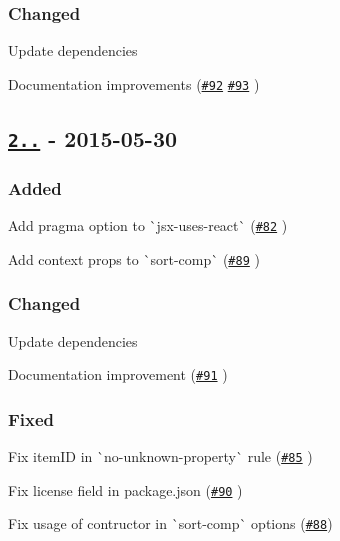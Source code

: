 \subsubsection*{Changed}


\begin{DoxyItemize}
\item Update dependencies
\item Documentation improvements (\href{https://github.com/yannickcr/eslint-plugin-react/pull/92}{\tt \#92} \href{https://github.com/yannickcr/eslint-plugin-react/pull/93}{\tt \#93} )
\end{DoxyItemize}

\subsection*{\href{https://github.com/yannickcr/eslint-plugin-react/compare/v2.3.0...v2.4.0}{\tt 2..} -\/ 2015-\/05-\/30}

\subsubsection*{Added}


\begin{DoxyItemize}
\item Add pragma option to \`{}jsx-\/uses-\/react\`{} (\href{https://github.com/yannickcr/eslint-plugin-react/pull/82}{\tt \#82} )
\item Add context props to \`{}sort-\/comp\`{} (\href{https://github.com/yannickcr/eslint-plugin-react/pull/89}{\tt \#89} )
\end{DoxyItemize}

\subsubsection*{Changed}


\begin{DoxyItemize}
\item Update dependencies
\item Documentation improvement (\href{https://github.com/yannickcr/eslint-plugin-react/pull/91}{\tt \#91} )
\end{DoxyItemize}

\subsubsection*{Fixed}


\begin{DoxyItemize}
\item Fix item\+ID in \`{}no-\/unknown-\/property\`{} rule (\href{https://github.com/yannickcr/eslint-plugin-react/pull/85}{\tt \#85} )
\item Fix license field in package.\+json (\href{https://github.com/yannickcr/eslint-plugin-react/pull/90}{\tt \#90} )
\item Fix usage of contructor in \`{}sort-\/comp\`{} options (\href{https://github.com/yannickcr/eslint-plugin-react/issues/88}{\tt \#88})
\end{DoxyItemize}

